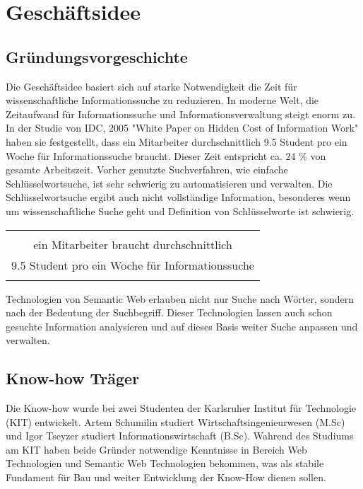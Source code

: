 \section{Geschäftsidee}


\subsection{Gründungsvorgeschichte}

Die Geschäftsidee basiert sich auf starke Notwendigkeit die Zeit für wissenschaftliche Informationssuche zu reduzieren. In moderne Welt, die Zeitaufwand für Informationssuche und Informationsverwaltung steigt enorm zu. In der Studie von IDC, 2005 "White Paper on Hidden Cost of Information Work" haben sie festgestellt, dass ein Mitarbeiter durchschnittlich 9.5 Student pro ein Woche für Informationssuche braucht. Dieser Zeit entspricht ca. 24 \% von gesamte Arbeitszeit. Vorher genutzte Suchverfahren, wie einfache Schlüsselwortsuche, ist sehr schwierig zu automatisieren und verwalten. Die Schlüsselwortsuche ergibt auch nicht vollständige Information, besonderes wenn um wissenschaftliche Suche geht und Definition von Schlüsselworte ist schwierig.
\begin{table}[h!]
  \centering
  \begin{large}
  \begin{tabular}{c}\hline
  \\
  {\color{orange}ein Mitarbeiter braucht durchschnittlich }\\
  {\color{orange}9.5 Student pro ein Woche für Informationssuche}\\
  \\\hline
  \end{tabular}
  \end{large}
\end{table}

Technologien von Semantic Web erlauben nicht nur Suche nach Wörter, sondern nach der Bedeutung der Suchbegriff. Dieser Technologien lassen auch schon gesuchte Information analysieren und auf dieses Basis weiter Suche anpassen und verwalten.

\subsection{Know-how Träger}
Die Know-how wurde bei zwei Studenten der Karlsruher Institut für Technologie (KIT) entwickelt. Artem Schumilin studiert Wirtschaftsingenieurwesen (M.Sc) und Igor Tseyzer studiert Informationswirtschaft (B.Sc). Wahrend des Studiums am KIT haben beide Gründer notwendige Kenntnisse in Bereich Web Technologien und Semantic Web Technologien bekommen, was als stabile Fundament für Bau und weiter Entwicklung der Know-How dienen sollen. 


